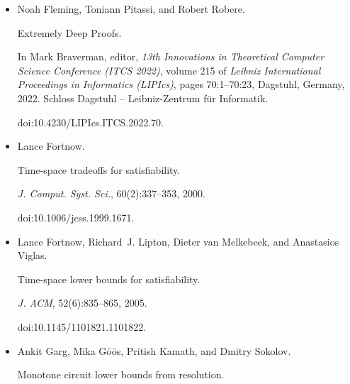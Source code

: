\begin{itemize}
Klim Efremenko, Michal Garlík, and Dmitry Itsykson.


Lower bounds for regular resolution over parities.


In Bojan Mohar, Igor Shinkar, and Ryan O’Donnell, editors, \emph{Proceedings of the 56th Annual ACM Symposium on Theory of Computing, STOC
2024, Vancouver, BC, Canada, June 24-28, 2024}, pages 640–651. ACM, 2024.


doi:10.1145/3618260.3649652.





\item[] 
[14]

Noah Fleming, Toniann Pitassi, and Robert Robere.


Extremely Deep Proofs.


In Mark Braverman, editor, \emph{13th Innovations in Theoretical
Computer Science Conference (ITCS 2022)}, volume 215 of \emph{Leibniz
International Proceedings in Informatics (LIPIcs)}, pages 70:1–70:23,
Dagstuhl, Germany, 2022. Schloss Dagstuhl – Leibniz-Zentrum für
Informatik.


doi:10.4230/LIPIcs.ITCS.2022.70.





\item[] 
[15]

Lance Fortnow.


Time-space tradeoffs for satisfiability.


\emph{J. Comput. Syst. Sci.}, 60(2):337–353, 2000.


doi:10.1006/jcss.1999.1671.





\item[] 
[16]

Lance Fortnow, Richard J. Lipton, Dieter van Melkebeek, and Anastasios Viglas.


Time-space lower bounds for satisfiability.


\emph{J. ACM}, 52(6):835–865, 2005.


doi:10.1145/1101821.1101822.





\item[] 
[17]

Ankit Garg, Mika Göös, Pritish Kamath, and Dmitry Sokolov.


Monotone circuit lower bounds from resolution.



\end{itemize}
